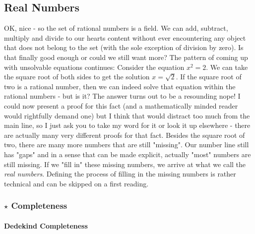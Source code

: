 \subsection{Real Numbers}
OK, nice - so the set of rational numbers is a field. We can add, subtract, multiply and divide to our hearts content without ever encountering any object that does not belong to the set (with the sole exception of division by zero). Is that finally good enough or could we still want more? The pattern of coming up with unsolvable equations continues: Consider the equation $x^2 = 2$. We can take the square root of both sides to get the solution $x = \sqrt{2}$. If the square root of two is a rational number, then we can indeed solve that equation within the rational numbers - but is it? The answer turns out to be a resounding nope! I could now present a proof for this fact (and a mathematically minded reader would rightfully demand one) but I think that would distract too much from the main line, so I just ask you to take my word for it or look it up elsewhere - there are actually many very different proofs for that fact. Besides the square root of two, there are many more numbers that are still "missing". Our number line still has "gaps" and in a sense that can be made explicit, actually "most" numbers are still missing. If we "fill in" these missing numbers, we arrive at what we call the \emph{real numbers}. Defining the process of filling in the missing numbers is rather technical and can be skipped on a first reading.



\subsubsection{$\star$ Completeness}

\paragraph{Dedekind Completeness}






